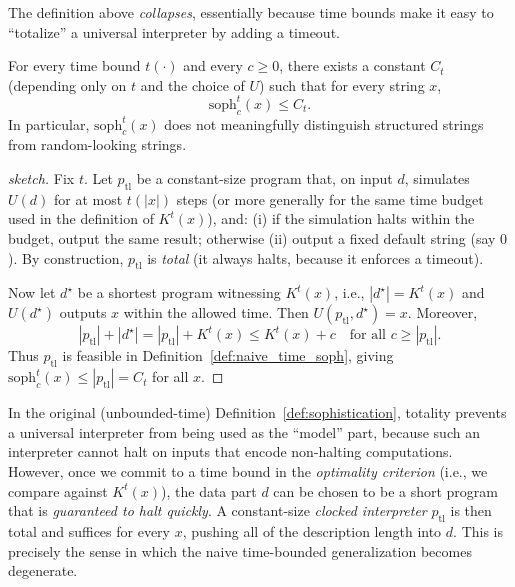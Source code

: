 \documentclass[twoside]{article}
\begin{document}
The definition above \emph{collapses}, essentially because time bounds make it easy to ``totalize'' a universal interpreter by adding a timeout.

\begin{lemma}
\label{prop:time_soph_degenerate}
For every time bound $t(\cdot)$ and every $c\ge 0$, there exists a constant $C_t$ (depending only on $t$ and the choice of $U$) such that for every string $x$,
\[
\mathrm{soph}^{t}_c(x) \le C_t.
\]
In particular, $\mathrm{soph}^{t}_c(x)$ does not meaningfully distinguish structured strings from random-looking strings.
\end{lemma}

\begin{proof}[sketch]
Fix $t$.
Let $p_{\mathrm{tl}}$ be a constant-size program that, on input $d$, simulates $U(d)$ for at most $t(|x|)$ steps (or more generally for the same time budget used in the definition of $K^{t}(x)$), and:
(i) if the simulation halts within the budget, output the same result; otherwise
(ii) output a fixed default string (say $0$).
By construction, $p_{\mathrm{tl}}$ is \emph{total} (it always halts, because it enforces a timeout).

Now let $d^\star$ be a shortest program witnessing $K^{t}(x)$, i.e., $|d^\star| = K^{t}(x)$ and $U(d^\star)$ outputs $x$ within the allowed time.
Then $U(p_{\mathrm{tl}}, d^\star)=x$.
Moreover,
\[
|p_{\mathrm{tl}}| + |d^\star|
=
|p_{\mathrm{tl}}| + K^{t}(x)
\le
K^{t}(x) + c
\quad\text{for all } c \ge |p_{\mathrm{tl}}|.
\]
Thus $p_{\mathrm{tl}}$ is feasible in Definition~\ref{def:naive_time_soph}, giving
$\mathrm{soph}^{t}_c(x) \le |p_{\mathrm{tl}}| = C_t$ for all $x$.
\end{proof}

In the original (unbounded-time) Definition~\ref{def:sophistication}, totality prevents a universal interpreter from being used as the ``model'' part, because such an interpreter cannot halt on inputs that encode non-halting computations.
However, once we commit to a time bound in the \emph{optimality criterion} (i.e., we compare against $K^{t}(x)$), the data part $d$ can be chosen to be a short program that is \emph{guaranteed to halt quickly}.
A constant-size \emph{clocked interpreter} $p_{\mathrm{tl}}$ is then total and suffices for every $x$, pushing all of the description length into $d$.
This is precisely the sense in which the naive time-bounded generalization becomes degenerate.
\end{document}
